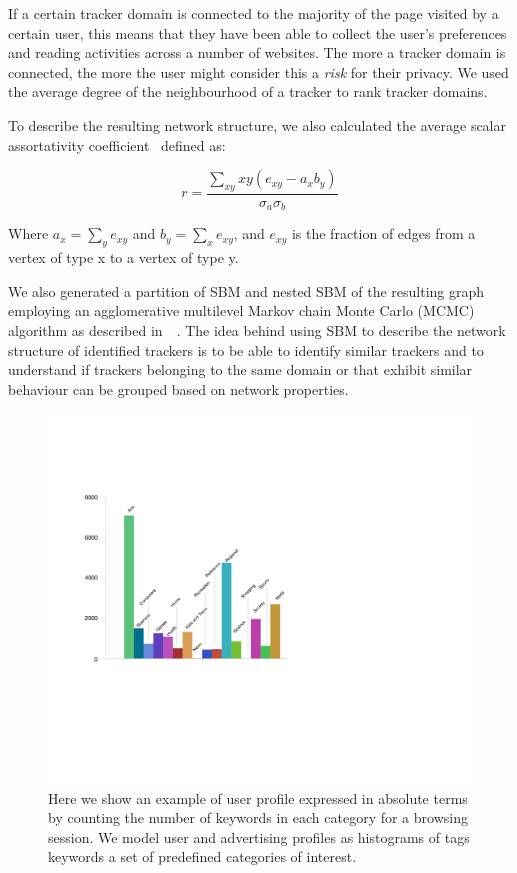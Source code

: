 If a certain tracker domain is connected to the majority of the page visited by a certain user, this means that they have been able to collect the user's preferences and reading activities across a number of websites. The more a tracker domain is connected, the more the user might consider this a \emph{risk} for their privacy. We used the average degree of the neighbourhood of a tracker to rank tracker domains.

To describe the resulting network structure, we also calculated the average scalar assortativity coefficient~\cite{newman2002assortative} defined as:

$$ r = \frac{\sum_{xy} xy(e_{xy} - a_x b_y)}{\sigma_a\sigma_b} $$

Where $a_x=\sum_ye_{xy}$ and $b_y=\sum_xe_{xy}$, and $e_{xy}$ is the fraction of edges from a vertex of type x to a vertex of type y.

We also generated a partition of SBM and nested SBM of the resulting graph employing an agglomerative multilevel Markov chain Monte Carlo (MCMC) algorithm as described in~\cite{peixoto2014efficient}~\cite{peixoto2013parsimonious}\cite{peixoto2012entropy}. The idea behind using SBM to describe the network structure of identified trackers is to be able to identify similar trackers and to understand if trackers belonging to the same domain or that exhibit similar behaviour can be grouped based on network properties.

\begin{figure}  
\includegraphics[width=\textwidth]{figures/absolute-population-profile-eps-converted-to.pdf}
\caption[A user's profile]{Here we show an example of user profile expressed in absolute terms by counting the number of keywords in each category for a browsing session. We model user and advertising profiles as histograms of tags keywords a set of predefined categories of interest.
\label{fig:abs-profile}}
\end{figure}

